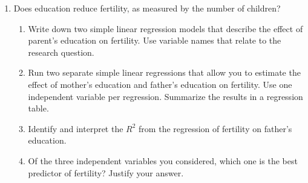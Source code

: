 \documentclass[11pt]{article}
\begin{document}
\begin{onehalfspacing}
\begin{enumerate}
\item Does education reduce fertility, as measured by the number of children? 
\begin{enumerate}
	\item Write down two simple linear regression models that describe the effect of parent's education on fertility. Use variable names that relate to the research question.
	\item Run two separate simple linear regressions that allow you to estimate the effect of mother's education and father's education on fertility. Use one independent variable per regression. Summarize the results in a regression table.
	\item Identify and interpret the $R^2$ from the regression of fertility on father's education.
	\item Of the three independent variables you considered, which one is the best predictor of fertility? Justify your answer. 
\end{enumerate}
\end{enumerate}


\end{onehalfspacing}
\end{document}
